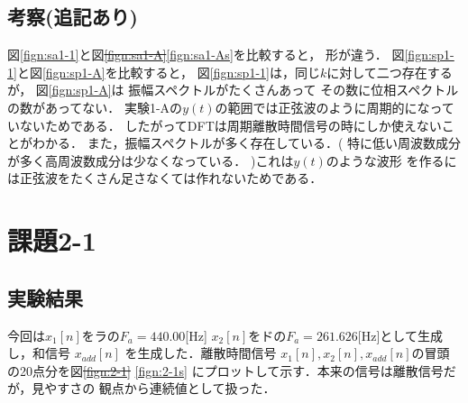 \documentclass[11pt, a4paper, titlepage]{ltjsarticle}
\begin{document}
\subsection*{考察(追記あり)}
図\ref*{fign:sa1-1}と図\sout{\ref*{fign:sa1-A}}\ref*{fign:sa1-As}を比較すると，
形が違う．
図\ref*{fign:sp1-1}と図\ref*{fign:sp1-A}を比較すると，
図\ref*{fign:sp1-1}は，同じ$k$に対して二つ存在するが，
図\ref*{fign:sp1-A}は
振幅スペクトルがたくさんあって
その数に位相スペクトルの数があってない．
実験1-Aの$y(t)$の範囲では正弦波のように周期的になっていないためである．
したがってDFTは周期離散時間信号の時にしか使えないことがわかる．
また，振幅スペクトルが多く存在している．(
    特に低い周波数成分が多く高周波数成分は少なくなっている．
)これは$y(t)$のような波形
を作るには正弦波をたくさん足さなくては作れないためである．

\newpage
\section*{課題2-1}
\subsection*{実験結果}
今回は$x_{1}[n]$をラの$F_{a}=440.00$[Hz]
$x_{2}[n]$をドの$F_{a}=261.626$[Hz]として生成し，和信号
$x_{add}[n]$ を生成した．離散時間信号
$x_{1}[n],x_{2}[n],x_{add}[n]$の冒頭の20点分を図\sout{\ref*{fign:2-1}}
\ref*{fign:2-1s}
にプロットして示す．本来の信号は離散信号だが，見やすさの
観点から連続値として扱った．
\end{document}
